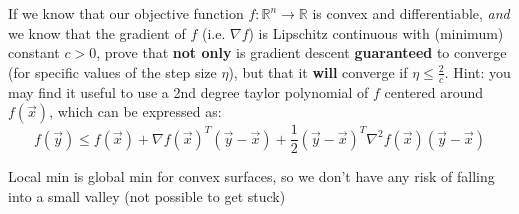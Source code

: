 \documentclass[11pt]{article}
\begin{document}
\noindent If we know that our objective function $f: \mathbb{R}^n \rightarrow \mathbb{R}$ is convex and differentiable, \textit{and} we know that the gradient of $f$ (i.e. $\nabla f$) is Lipschitz continuous with (minimum) constant $c > 0$, prove that \textbf{not only} is gradient descent \textbf{guaranteed} to converge (for specific values of the step size $\eta$), but that it \textbf{will} converge if $\eta \le \frac{2}{c}$.\newline\newline
\noindent Hint: you may find it useful to use a 2nd degree taylor polynomial of $f$ centered around $f(\vec{x})$, which can be expressed as:
$$f(\vec{y}) \le f(\vec{x}) + \nabla f(\vec{x})^T (\vec{y}-\vec{x}) + \frac{1}{2}(\vec{y}-\vec{x})^T\nabla^2 f(\vec{x})(\vec{y}-\vec{x})$$

Local min is global min for convex surfaces, so we don't have any risk of falling into a small valley (not possible to get stuck)
\end{document}
